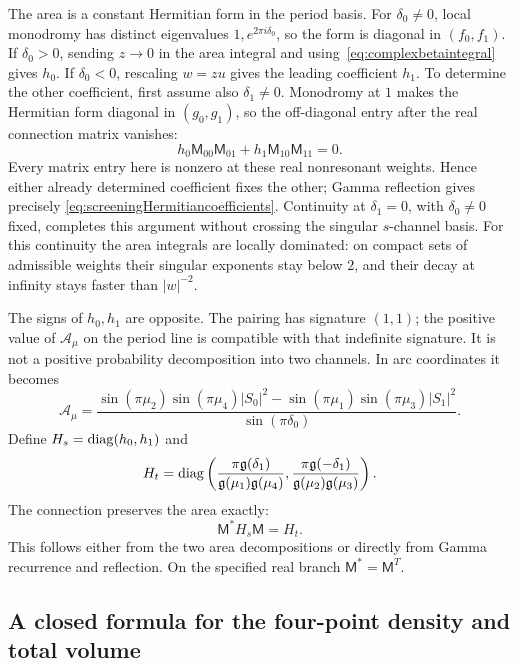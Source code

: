 The area is a constant Hermitian form in the period basis.
For $\delta_0\ne0$, local monodromy has distinct eigenvalues
$1,e^{2\pi i\delta_0}$, so the form is diagonal in
$(f_0,f_1)$. If $\delta_0>0$, sending $z\to0$ in the area
integral and using~\eqref{eq:complexbetaintegral} gives $h_0$.
If $\delta_0<0$, rescaling $w=zu$ gives the leading
coefficient $h_1$. To determine the other coefficient, first
assume also $\delta_1\ne0$. Monodromy at $1$ makes the
Hermitian form diagonal in $(g_0,g_1)$, so the off-diagonal
entry after the real connection matrix vanishes:
\[
 h_0\mathsf M_{00}\mathsf M_{01}
       +h_1\mathsf M_{10}\mathsf M_{11}=0.
\]
Every matrix entry here is nonzero at these real nonresonant
weights. Hence either already determined coefficient fixes
the other; Gamma reflection gives precisely
\eqref{eq:screeningHermitiancoefficients}. Continuity at
$\delta_1=0$, with $\delta_0\ne0$ fixed, completes this
argument without crossing the singular $s$-channel basis.
For this continuity the area integrals are locally dominated:
on compact sets of admissible weights their singular exponents
stay below $2$, and their decay at infinity stays faster than
$|w|^{-2}$.

The signs of $h_0,h_1$ are opposite. The pairing has signature
$(1,1)$; the positive value of $\mathcal A_\mu$ on the period
line is compatible with that indefinite signature. It is not
a positive probability decomposition into two channels.
In arc coordinates it becomes
\begin{equation}
 \mathcal A_\mu=
 \frac{\sin(\pi\mu_2)\sin(\pi\mu_4)|S_0|^2
       -\sin(\pi\mu_1)\sin(\pi\mu_3)|S_1|^2}
      {\sin(\pi\delta_0)}.
 \label{eq:screeningarcarea}
\end{equation}
Define $H_s=\operatorname{diag}(h_0,h_1)$ and
\[
 H_t=\operatorname{diag}\left(
   \frac{\pi\mathfrak g(\delta_1)}
        {\mathfrak g(\mu_1)\mathfrak g(\mu_4)},
   \frac{\pi\mathfrak g(-\delta_1)}
        {\mathfrak g(\mu_2)\mathfrak g(\mu_3)}\right).
\]
The connection preserves the area exactly:
\begin{equation}
 \mathsf M^*H_s\mathsf M=H_t.
 \label{eq:fusionHermitianidentity}
\end{equation}
This follows either from the two area decompositions or
directly from Gamma recurrence and reflection. On the
specified real branch $\mathsf M^*=\mathsf M^T$.

\subsection{A closed formula for the four-point density and total volume}

